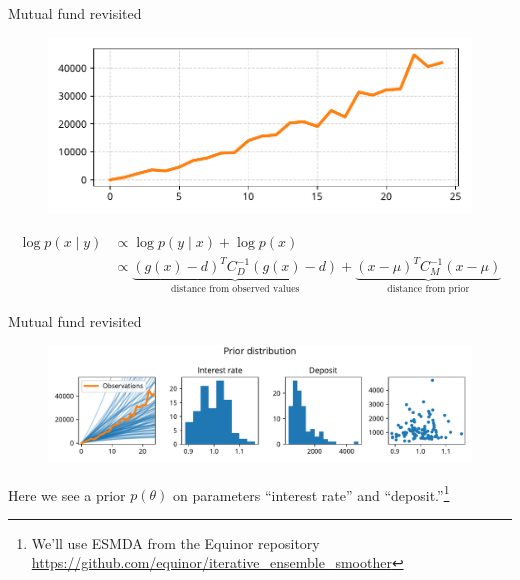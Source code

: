 \documentclass[12pt, aspectratio=149]{beamer}
\theoremstyle{plain}
\begin{document}
\begin{frame}[fragile]{Mutual fund revisited}
\vspace*{-1em}
\begin{center}
 \begin{figure}
    	\centering
    	\includegraphics[width=0.99\linewidth]{figures/esmda_observations.pdf}
 \end{figure}
\begin{align*}
\log p(x \mid y) 
&\propto \log p(y \mid x) + \log p(x) \\
&\propto
\underbrace{(g(x) - d)^T C_D^{-1} (g(x) - d)}_{\text{distance from observed values}} +
\underbrace{(x - \mu)^T C_M^{-1} (x - \mu) }_{\text{distance from prior}}
\end{align*}
 \end{center}
\end{frame}

\begin{frame}[fragile]{Mutual fund revisited}
\vspace*{-1em}
\begin{center}
 \begin{figure}
    	\centering
    	\includegraphics[width=0.99\linewidth]{figures/esmda_prior_no_truth.pdf}
 \end{figure}
 Here we see a prior $p(\theta)$ on parameters ``interest rate'' and ``deposit.''\footnote{We'll use ESMDA from the Equinor repository\\ \href{https://github.com/equinor/iterative_ensemble_smoother}{https://github.com/equinor/iterative\_ensemble\_smoother}}
 \end{center}
\end{frame}
\end{document}
